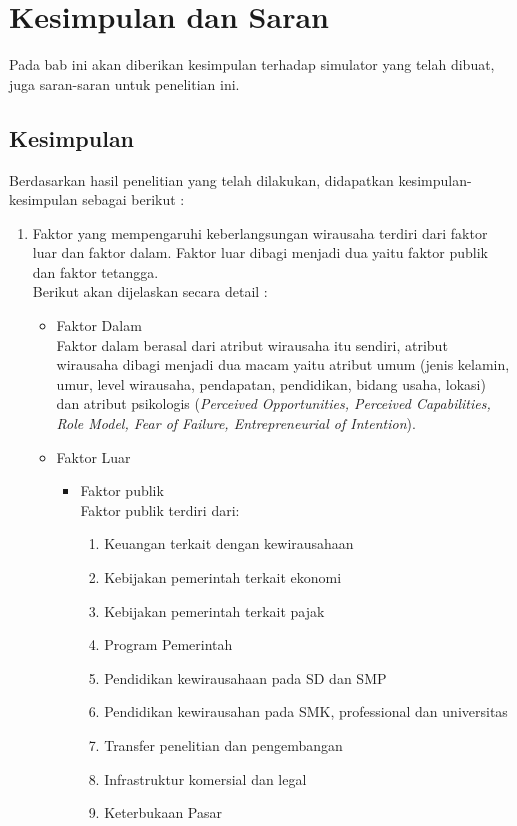 \chapter{Kesimpulan dan Saran}
\label{chap:kesimpulan}

Pada bab ini akan diberikan kesimpulan terhadap simulator yang telah dibuat, juga saran-saran untuk penelitian ini.

\section{Kesimpulan}
Berdasarkan hasil penelitian yang telah dilakukan, didapatkan kesimpulan-kesimpulan sebagai berikut :
\begin{enumerate}
	\item Faktor yang mempengaruhi keberlangsungan wirausaha terdiri dari faktor luar dan faktor dalam. Faktor luar dibagi menjadi dua yaitu faktor publik dan faktor tetangga.\\
Berikut akan dijelaskan secara detail :
	\begin{itemize}
		\item Faktor Dalam\\
		Faktor dalam berasal dari atribut wirausaha itu sendiri, atribut wirausaha dibagi menjadi dua macam yaitu atribut umum (jenis kelamin, umur, level wirausaha, pendapatan, pendidikan, bidang usaha, lokasi) dan atribut psikologis (\textit{Perceived Opportunities, Perceived Capabilities, Role Model, Fear of Failure, Entrepreneurial of Intention}).
		\item Faktor Luar
		\begin{itemize}
			\item Faktor publik\\
			Faktor publik terdiri dari:
			\begin{enumerate}
				\item Keuangan terkait dengan kewirausahaan
				\item Kebijakan pemerintah terkait ekonomi
				\item Kebijakan pemerintah terkait pajak
				\item Program Pemerintah
				\item Pendidikan kewirausahaan pada SD dan SMP
				\item Pendidikan kewirausahan pada SMK, professional dan universitas
				\item Transfer penelitian dan pengembangan
				\item Infrastruktur komersial dan legal
				\item Keterbukaan Pasar

\end{enumerate}
\end{itemize}
\end{itemize}
\end{enumerate}
